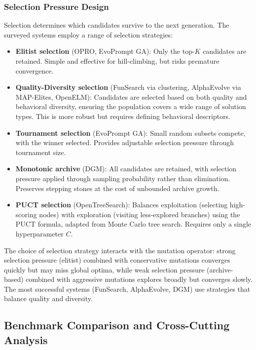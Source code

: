 \subsubsection{Selection Pressure Design}

Selection determines which candidates survive to the next generation. The surveyed systems employ a range of selection strategies:

\begin{itemize}
    \item \textbf{Elitist selection} (OPRO, EvoPrompt GA): Only the top-$K$ candidates are retained. Simple and effective for hill-climbing, but risks premature convergence.
    \item \textbf{Quality-Diversity selection} (FunSearch via clustering, AlphaEvolve via MAP-Elites, OpenELM): Candidates are selected based on both quality and behavioral diversity, ensuring the population covers a wide range of solution types. This is more robust but requires defining behavioral descriptors.
    \item \textbf{Tournament selection} (EvoPrompt GA): Small random subsets compete, with the winner selected. Provides adjustable selection pressure through tournament size.
    \item \textbf{Monotonic archive} (DGM): All candidates are retained, with selection pressure applied through sampling probability rather than elimination. Preserves stepping stones at the cost of unbounded archive growth.
    \item \textbf{PUCT selection} (OpenTreeSearch): Balances exploitation (selecting high-scoring nodes) with exploration (visiting less-explored branches) using the PUCT formula, adapted from Monte Carlo tree search. Requires only a single hyperparameter $C$.
\end{itemize}

The choice of selection strategy interacts with the mutation operator: strong selection pressure (elitist) combined with conservative mutations converges quickly but may miss global optima, while weak selection pressure (archive-based) combined with aggressive mutations explores broadly but converges slowly. The most successful systems (FunSearch, AlphaEvolve, DGM) use strategies that balance quality and diversity.


\subsection{Benchmark Comparison and Cross-Cutting Analysis}
\label{sec:ch4-benchmark}

